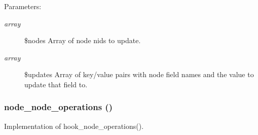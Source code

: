 \begin{Desc}
\item[Parameters:]
\begin{description}
\item[{\em array}]\$nodes Array of node nids to update. \item[{\em array}]\$updates Array of key/value pairs with node field names and the value to update that field to. \end{description}
\end{Desc}
\hypertarget{node_8admin_8inc_6e9cc98ef5c62744d557bf52b8531553}{
\subsubsection[{node\_\-node\_\-operations}]{\setlength{\rightskip}{0pt plus 5cm}node\_\-node\_\-operations ()}}
\label{node_8admin_8inc_6e9cc98ef5c62744d557bf52b8531553}


Implementation of hook\_\-node\_\-operations(). 